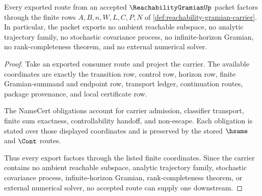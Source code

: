 \begin{theorem}
\label{thm:reachability-gramian-ledger-nonescape}
Every exported route from an accepted $\ReachabilityGramianUp$ packet factors through the finite rows $A,B,n,W,L,C,P,N$ of \autoref{def:reachability-gramian-carrier}. In particular, the packet exports no ambient reachable subspace, no analytic trajectory family, no stochastic covariance process, no infinite-horizon Gramian, no rank-completeness theorem, and no external numerical solver.
\end{theorem}
\begin{proof}
Take an exported consumer route and project the carrier. The available coordinates are exactly the transition row, control row, horizon row, finite Gramian-summand and endpoint row, transport ledger, continuation routes, package provenance, and local certificate row.

The NameCert obligations account for carrier admission, classifier transport, finite sum exactness, controllability handoff, and non-escape. Each obligation is stated over those displayed coordinates and is preserved by the stored $\hsame$ and $\Cont$ routes.

Thus every export factors through the listed finite coordinates. Since the carrier contains no ambient reachable subspace, analytic trajectory family, stochastic covariance process, infinite-horizon Gramian, rank-completeness theorem, or external numerical solver, no accepted route can supply one downstream.
\end{proof}


\begin{closurestatus}{\ReachabilityGramianUp}
  \theoryclosure{\scopedClosure}
  \formalstatus{\unformalizedV}
\end{closurestatus}
